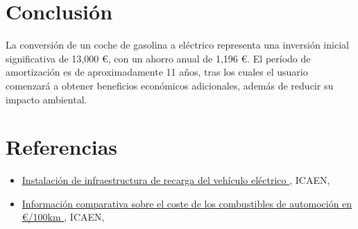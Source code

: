 \documentclass[10pt, a4paper, twoside, twocolumn]{article}
\let\OldTextField\TextField
\renewcommand{\TextField}[2][]{%
  \raisebox{-0.1ex}{\OldTextField[height=.95em,  bordercolor={1 1 1}, backgroundcolor={1 1 1},#1]{#2}}%
}
\begin{document}
\begin{Form}
	\section{Conclusión}
	La conversión de un coche de gasolina a eléctrico representa una inversión inicial significativa de 13,000 €, con un ahorro anual de 1,196 €. El período de amortización es de aproximadamente 11 años, tras los cuales el usuario comenzará a obtener beneficios económicos adicionales, además de reducir su impacto ambiental.


	\section{Referencias}
	\begin{itemize}
		\item \href{
			      https://icaen.gencat.cat/es/detalls/publicacio/Num.-9-Installacio-dinfraestructura-de-recarrega-del-vehicle-electric

		      }
		      {
			      Instalación de infraestructura de recarga del vehículo eléctrico
		      }
		      , ICAEN,
		\item \href{
			https://eurospor100km.energia.gob.es/Paginas/Index.aspx

		      }
		      {
				Información comparativa sobre el coste de los combustibles de automoción en €/100km
		      }
		      , ICAEN,


	\end{itemize}











	\TextField[name=I0 ,width=0cm]{}
	\TextField[name=Bt,width=0cm]{}






\end{Form}
\end{document}
